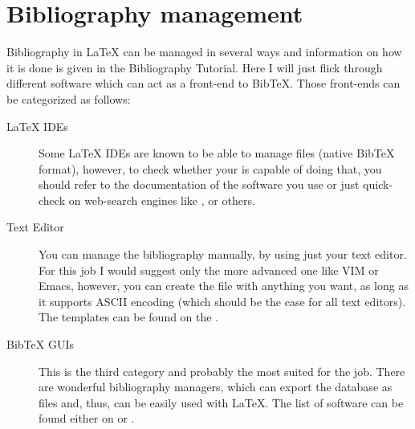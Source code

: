 \documentclass[
    draft
]{scrartcl}
\begin{document}
\section{Bibliography management}

%
Bibliography in \LaTeX{} can be managed in several ways and information on how it
    is done is given in the Bibliography Tutorial.
%
Here I will just flick through different software which can act as a front-end
    to Bib\TeX{}.
%
Those front-ends can be categorized as follows:
%
\begin{description}
    \item[\LaTeX{} IDEs]
        Some \LaTeX{} IDEs are known to be able to manage  files
            (native Bib\TeX{} format), however, to check whether your is capable
            of doing that, you should refer to the documentation of the software
            you use or just quick-check on web-search engines like
            ,
             or others.
    \item[Text Editor]
        You can manage the bibliography manually, by using just your text
            editor.
        For this job I would suggest only the more advanced one like VIM or
            Emacs, however, you can create the  file with anything
            you want, as long as it supports ASCII encoding (which should be the
            case for all text editors).
        The templates can be found on the
            .
    \item[Bib\TeX{} GUIs]
        This is the third category and probably the most suited for the job.
        There are wonderful bibliography managers, which can export the database
            as  files and, thus, can be easily used with \LaTeX{}.
        The list of software can be found either on 
            or
            .
\end{description}
\end{document}
